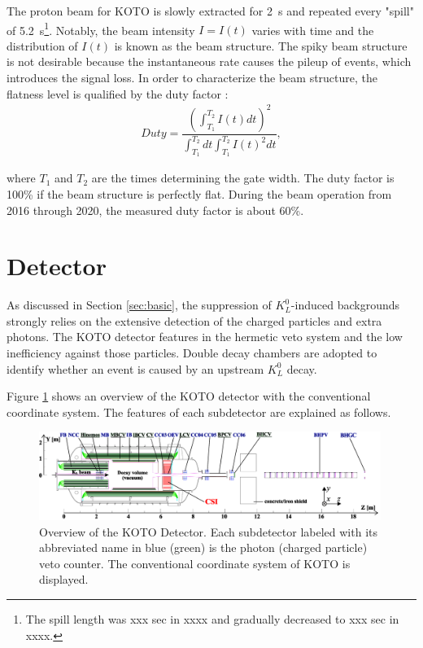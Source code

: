 The proton beam for KOTO is slowly extracted for 2~s and repeated every "spill" of 5.2~s\footnote{The spill length was xxx sec in xxxx and gradually decreased to xxx sec in xxxx.}. Notably, the beam intensity $I=I(t)$ varies with time and the distribution of $I(t)$ is known as the beam structure. The spiky beam structure is not desirable because the instantaneous rate causes the pileup of events, which introduces the signal loss. In order to characterize the beam structure, the flatness level is qualified by the duty factor \parencite{MR}: \mynobreakpar
%
\begin{align}
\textit{Duty} = \dfrac{\left( \int_{T_1}^{T_2} I(t) dt  \right)^2}{\int_{T_1}^{T_2} dt \int_{T_1}^{T_2} I(t)^2 dt},
\end{align}

\noindent
where $T_1$ and $T_2$ are the times determining the gate width. The duty factor is 100\% if the beam structure is perfectly flat. During the beam operation from 2016 through 2020, the measured duty factor is about 60\%.

\section{Detector}

As discussed in Section \ref{sec:basic}, the suppression of $K_L^0$-induced backgrounds strongly relies on the extensive detection of the charged particles and extra photons. The KOTO detector features in the hermetic veto system and the low inefficiency against those particles. Double decay chambers are adopted to identify whether an event is caused by an upstream $K_L^0$ decay. 

Figure \ref{fig:detector} shows an overview of the KOTO detector with the conventional coordinate system. The features of each subdetector are explained as follows.%
 
\begin{figure}
\centering
\includegraphics[width=0.99\textwidth]{Figures/Chapter3/KOTODetector2018.pdf}
\caption{Overview of the KOTO Detector. Each subdetector labeled with its abbreviated name in blue (green) is the photon (charged particle) veto counter. The conventional coordinate system of KOTO is displayed.}
\label{fig:detector}
\end{figure}


